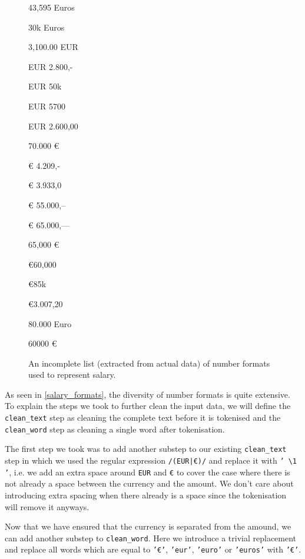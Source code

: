 \documentclass[runningheads]{llncs}
\begin{document}
\begin{figure}
	\centering

  \begin{multicols}{3}
    \begin{description}
      \item 43,595 Euros
      \item 30k Euros
      \item 3,100.00 EUR
      \item EUR 2.800,-
      \item EUR 50k
      \item EUR 5700
      \item EUR 2.600,00
      \item 70.000 €
      \item € 4.209,-
      \item € 3.933,0
      \item € 55.000,--
      \item € 65.000,---
      \item 65,000 €
      \item €60,000
      \item €85k
      \item €3.007,20
      \item 80.000 Euro
      \item 60000 €
    \end{description}
  \end{multicols}
  \caption{An incomplete list (extracted from actual data) of number formats used to represent salary.}
  \label{salary_formats}
\end{figure}

As seen in \autoref{salary_formats}, the diversity of number formats is quite extensive. To explain the steps we took to further clean the input data, we will define the \texttt{clean\_text} step as cleaning the complete text before it is tokenised and the \texttt{clean\_word} step as cleaning a single word after tokenisation.

The first step we took was to add another substep to our existing \texttt{clean\_text} step in which we used the regular expression \texttt{/(EUR|€)/} and replace it with \texttt{' \textbackslash1 '}, i.e. we add an extra space around \texttt{EUR} and \texttt{€} to cover the case where there is not already a space between the currency and the amount. We don't care about introducing extra spacing when there already is a space since the tokenisation will remove it anyways.

Now that we have ensured that the currency is separated from the amound, we can add another substep to \texttt{clean\_word}. Here we introduce a trivial replacement and replace all words which are equal to \texttt{'€'}, \texttt{'eur'}, \texttt{'euro'} or \texttt{'euros'} with \texttt{'€'}.
\end{document}
